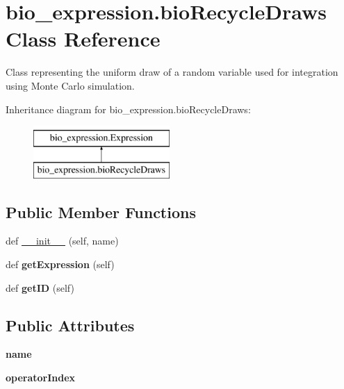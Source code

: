 \hypertarget{classbio__expression_1_1bio_recycle_draws}{}\section{bio\+\_\+expression.\+bio\+Recycle\+Draws Class Reference}
\label{classbio__expression_1_1bio_recycle_draws}


Class representing the uniform draw of a random variable used for integration using Monte Carlo simulation.  


Inheritance diagram for bio\+\_\+expression.\+bio\+Recycle\+Draws\+:\begin{figure}[H]
\begin{center}
\leavevmode
\includegraphics[height=2.000000cm]{classbio__expression_1_1bio_recycle_draws}
\end{center}
\end{figure}
\subsection*{Public Member Functions}
\begin{DoxyCompactItemize}
\item 
def \hyperlink{classbio__expression_1_1bio_recycle_draws_abffd9912c732a5f70a5d47cfca3cc0b3}{\+\_\+\+\_\+init\+\_\+\+\_\+} (self, name)
\item 
def {\bfseries get\+Expression} (self)\hypertarget{classbio__expression_1_1bio_recycle_draws_a43ce53e9a2a958ae189e6e6d3a7915d1}{}\label{classbio__expression_1_1bio_recycle_draws_a43ce53e9a2a958ae189e6e6d3a7915d1}

\item 
def {\bfseries get\+ID} (self)\hypertarget{classbio__expression_1_1bio_recycle_draws_a770b116dea166d838f7bb6433bba6b53}{}\label{classbio__expression_1_1bio_recycle_draws_a770b116dea166d838f7bb6433bba6b53}

\end{DoxyCompactItemize}
\subsection*{Public Attributes}
\begin{DoxyCompactItemize}
\item 
{\bfseries name}\hypertarget{classbio__expression_1_1bio_recycle_draws_a7779b3b27800a3b4b3b711576a92961e}{}\label{classbio__expression_1_1bio_recycle_draws_a7779b3b27800a3b4b3b711576a92961e}

\item 
{\bfseries operator\+Index}\hypertarget{classbio__expression_1_1bio_recycle_draws_a0389c0ee5fa8c689129fcb182f31458a}{}\label{classbio__expression_1_1bio_recycle_draws_a0389c0ee5fa8c689129fcb182f31458a}

\end{DoxyCompactItemize}


